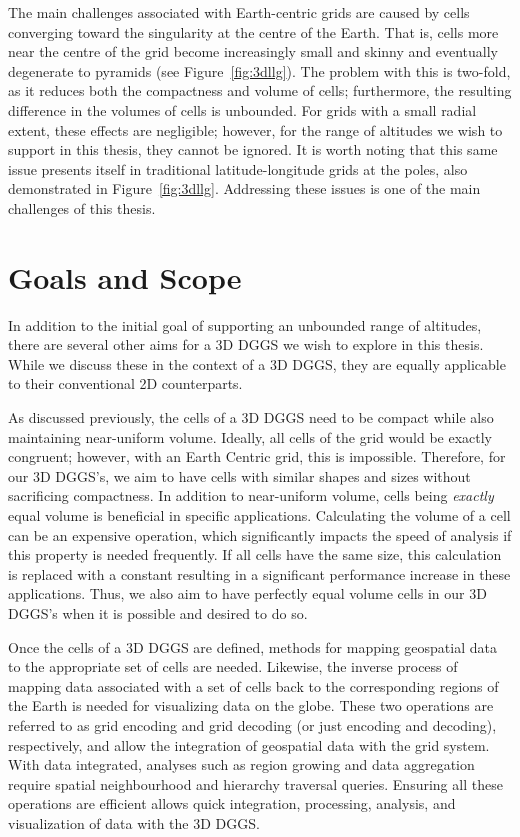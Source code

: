 The main challenges associated with Earth-centric grids are caused by cells converging toward the singularity at the centre of the Earth.
That is, cells more near the centre of the grid become increasingly small and skinny and eventually degenerate to pyramids
(see Figure~\ref{fig:3dllg}).
The problem with this is two-fold, as it reduces both the compactness and volume of cells; furthermore, the resulting difference in the volumes of cells is unbounded.
For grids with a small radial extent, these effects are negligible; however, for the range of altitudes we wish to support in this thesis, they cannot be ignored.
It is worth noting that this same issue presents itself in traditional latitude-longitude grids at the poles, also demonstrated in Figure~\ref{fig:3dllg}.
Addressing these issues is one of the main challenges of this thesis.


\section{Goals and Scope} \label{chap:1:goals}
In addition to the initial goal of supporting an unbounded range of altitudes, there are several other aims for a 3D DGGS we wish to explore in this thesis.
While we discuss these in the context of a 3D DGGS, they are equally applicable to their conventional 2D counterparts.



As discussed previously, the cells of a 3D DGGS need to be compact while also maintaining near-uniform volume.
Ideally, all cells of the grid would be exactly congruent; however, with an Earth Centric grid, this is impossible.
Therefore, for our 3D DGGS's, we aim to have cells with similar shapes and sizes without sacrificing compactness.
In addition to near-uniform volume, cells being \textit{exactly} equal volume is beneficial in specific applications.
Calculating the volume of a cell can be an expensive operation, which significantly impacts the speed of analysis if this property is needed frequently.
If all cells have the same size, this calculation is replaced with a constant resulting in a significant performance increase in these applications.
Thus, we also aim to have perfectly equal volume cells in our 3D DGGS's when it is possible and desired to do so.


Once the cells of a 3D DGGS are defined, methods for mapping geospatial data to the appropriate set of cells are needed.
Likewise, the inverse process of mapping data associated with a set of cells back to the corresponding regions of the Earth is needed for visualizing data on the globe.
These two operations are referred to as grid encoding and grid decoding (or just encoding and decoding), respectively, and allow the integration of geospatial data with the grid system.
With data integrated, analyses such as region growing and data aggregation require spatial neighbourhood and hierarchy traversal queries.
Ensuring all these operations are efficient allows quick integration, processing, analysis, and visualization of data with the 3D DGGS.


